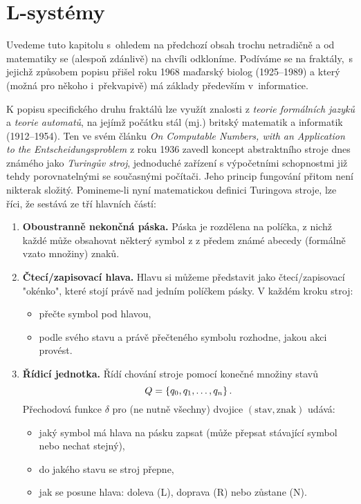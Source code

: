 \section{L-systémy}\label{sec:L-systemy}

Uvedeme tuto kapitolu s~ohledem na předchozí obsah trochu netradičně a od matematiky se (alespoň zdánlivě) na chvíli odkloníme. Podíváme se na fraktály,~s jejichž způsobem popisu přišel roku 1968 maďarský biolog  (1925--1989) a který (možná pro někoho i~překvapivě) má základy především v~informatice. \citep[str. 2]{Prusinkiewicz1990}

K popisu specifického druhu fraktálů lze využít znalosti z \emph{teorie formálních jazyků} a \emph{teorie automatů}, na jejímž počátku stál (mj.) britský matematik a informatik  (1912--1954). Ten ve svém článku \emph{On Computable Numbers, with an Application to the Entscheidungsproblem} z roku 1936 zavedl koncept abstraktního stroje dnes známého jako \emph{Turingův stroj}, jednoduché zařízení s výpočetními schopnostmi již tehdy porovnatelnými se současnými počítači. Jeho princip fungování přitom není nikterak složitý. Pomineme-li nyní matematickou definici Turingova stroje, lze říci, že sestává ze tří hlavních částí:
\begin{enumerate}
    \item \textbf{Oboustranně nekončná páska.} Páska je rozdělena na políčka, z nichž každé může obsahovat některý symbol z z předem známé abecedy (formálně vzato množiny) znaků.
    \item \textbf{Čtecí/zapisovací hlava.} Hlavu si můžeme představit jako čtecí/zapisovací "okénko", které stojí právě nad jedním políčkem pásky. V každém kroku stroj:
    \begin{itemize}
        \item přečte symbol pod hlavou,
        \item podle svého stavu a právě přečteného symbolu rozhodne, jakou akci provést.
    \end{itemize}
    \item \textbf{Řídicí jednotka.} Řídí chování stroje pomocí konečné množiny stavů
    \[Q=\left\{q_0,q_1,\ldots,q_n\right\}.\]
    Přechodová funkce $\delta$ pro (ne nutně všechny) dvojice $(\text{stav},\text{znak})$ udává:
    \begin{itemize}
        \item jaký symbol má hlava na pásku zapsat (může přepsat stávající symbol nebo nechat stejný),
        \item do jakého stavu se stroj přepne,
        \item jak se posune hlava: doleva (L), doprava (R) nebo zůstane (N).
    \end{itemize}    
\end{enumerate}
